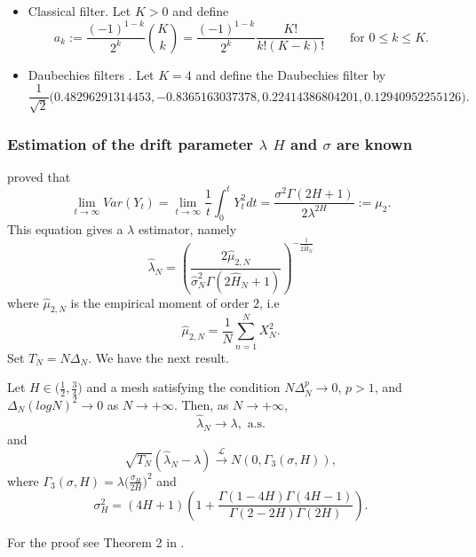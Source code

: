 \documentclass[smallextended]{svjour3}
\begin{document}
    \begin{itemize}
        \item Classical filter. 
        Let $K>0$ and define
        \begin{equation*}
            a_k:= 
            \frac{(-1)^{1-k}}{2^k} 
            {K\choose k} =
            \frac{(-1)^{1-k}}{2^k}
            \frac{K!}{k!(K-k)!}\qquad \mbox{for }  0\le k\le K.
        \end{equation*}

        \item Daubechies filters 
             \citep[see][for original definition]{de}. 
                 Let $K=4$ and define the Daubechies filter by
        \begin{equation*}
            \frac{1}{\sqrt{2}} 
                \big(
                    \num{0.48296291314453}, 
                    \num{-0.8365163037378},
                    \num{0.22414386804201},
                    \num{0.12940952255126}
                \big).
        \end{equation*}
    \end{itemize}

\subsubsection{Estimation of the drift parameter $\lambda$  $H$ and
                $\sigma$ are known}
    \citet{hu-nu} proved that
    \[
        \lim_{t\rightarrow \infty} Var (Y_t)= \lim_{t\rightarrow \infty}
        \frac{1}{t}\int_0^t Y_t^2 dt = \frac{\sigma^2 \Gamma(2H+1) }
        {2\lambda^{2H}}:=\mu_2.
    \]
    This equation gives a $\lambda$ estimator, namely
    \begin{equation} \label{est3}
        \hat{\lambda}_N = 
            \left(
                \dfrac{ 2\hat{\mu}_{2,N} }{ 
                    \hat{\sigma}_N^2 
                    \Gamma(2\hat{H}_N+1)
                }
            \right) ^ {-\tfrac{1}{2\hat{H}_N}}
    \end{equation}
    where $\hat{\mu}_{2,N}$ is the empirical moment of order $2$, i.e
    \[
        \hat{\mu}_{2,N} =
            \dfrac{1}{N}
            \sum_{n=1}^N X_N^2.
    \]
    Set $T_N=N\Delta_N$. We have the next result.
    \begin{theorem}
        Let $H \in \big(\tfrac{1}{2} , \tfrac{3}{4}\big)$ and a mesh satisfying 
        the condition $N \Delta_N^p\rightarrow 0$, $p>1$,
        and $ \Delta_N (log N )^2 \rightarrow 0$ as $N \rightarrow +\infty$. 
        Then,
        as $N \rightarrow +\infty$,
        \[
            \hat{\lambda}_N {\to}  \lambda, \text{ a.s.}
    \]
    and
    \[
        \sqrt{T_N} ( \hat{\lambda}_N -\lambda)
        \stackrel{\mathcal{L}}{\longrightarrow} N (0, \Gamma_3 (\sigma,H)),
    \]
    where 
    $\Gamma_3 (\sigma,H)=\lambda \big(\tfrac{\sigma_H}{2H} \big)^2$ and
    \[
        \sigma_H^2= (4H+1)
        \left(
            1+
            \frac{\Gamma(1-4H)\Gamma(4H-1)}{\Gamma(2-2H)\Gamma(2H)} 
        \right).
    \]
\end{theorem}
For the proof see Theorem 2 in \cite{br-ia}.
\end{document}

